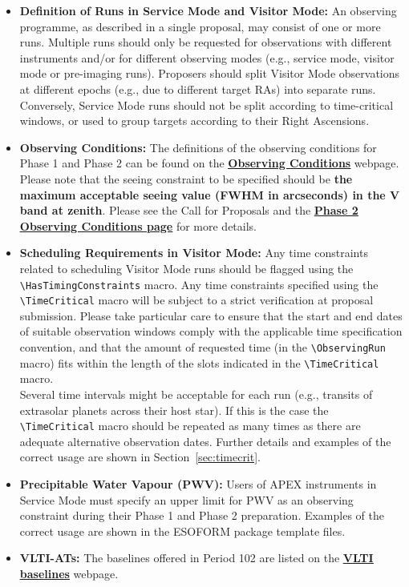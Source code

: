 \documentclass{article}
\begin{document}
\begin{itemize}
\item{\bf Definition of Runs in Service Mode and Visitor Mode:}
An observing programme, as described in a single proposal, may consist of one or more runs. Multiple runs should only be requested for observations with different instruments and/or for different observing modes (e.g., service mode, visitor mode or pre-imaging runs). Proposers should split Visitor Mode observations at different epochs (e.g., due to different target RAs) into separate runs. Conversely, Service Mode runs should not be split according to time-critical windows, or used to group targets according to their Right Ascensions.

\item{\bf Observing Conditions:} The definitions of the observing conditions for Phase 1 and Phase 2 can be found on the  \href{http://www.eso.org/sci/observing/phase2/ObsConditions.html}{\bf \underline{Observing Conditions}} webpage. Please note that the seeing constraint to be specified should be 
{\bf the maximum acceptable seeing value (FWHM in arcseconds) in the V band at zenith}.
Please see the Call for Proposals and the 
\href{http://www.eso.org/sci/observing/phase2/ObsConditions.html}{\bf\underline{Phase 2 Observing Conditions page}}
for more details.

\item{\bf Scheduling Requirements in Visitor Mode:}
Any time constraints related to scheduling Visitor Mode runs should be flagged
using the \verb|\HasTimingConstraints| macro.
Any time constraints specified using the \verb|\TimeCritical| macro 
will be subject to a strict verification  at proposal submission. Please take
particular care to ensure
that the start and end dates of suitable observation windows comply
with the applicable time specification convention, and that the
amount of requested time (in the \verb|\ObservingRun| macro) fits
within the length of the slots indicated in the
\verb|\TimeCritical| macro.  \\
Several time intervals might be acceptable for each run 
(e.g., transits of extrasolar planets
across their host star). If this is the case the \verb|\TimeCritical| macro should be 
repeated as many   times as there are adequate alternative observation dates.
Further details and examples of the
correct usage are shown in Section~\ref{sec:timecrit}. 


\item{\bf Precipitable Water Vapour (PWV):} Users of
APEX instruments in Service Mode must specify an upper limit for PWV
as an observing constraint during their Phase 1 and Phase 2
preparation. Examples of the correct usage are shown in the ESOFORM package 
template files.

\item{\bf VLTI-ATs:} The baselines offered in Period 102 are listed on the
\href{http://www.eso.org/sci/facilities/paranal/telescopes/vlti/configuration/index.html}
{\bf\underline{VLTI baselines}} webpage.

\end{itemize}
\end{document}
